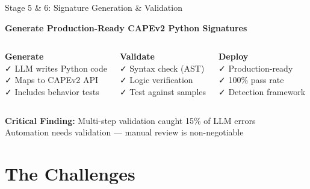 \documentclass[11pt,aspectratio=16:9]{beamer}
\begin{document}
\begin{frame}{Stage 5 \& 6: Signature Generation \& Validation}
  \vspace{0.3cm}
  \begin{tcolorbox}[colback=accent2!10, colframe=accent2, boxrule=2pt]
    {\textbf{Generate Production-Ready CAPEv2 Python Signatures}}
  \end{tcolorbox}
  
  \vspace{0.4cm}
  \small
  \begin{columns}[T]
    \centering
    \textbf{\textcolor{accent1}{Generate}}\\[0.3cm]
    ✓ LLM writes Python code\\
    ✓ Maps to CAPEv2 API\\
    ✓ Includes behavior tests
    
    \centering
    \textbf{\textcolor{accent2}{Validate}}\\[0.3cm]
    ✓ Syntax check (AST)\\
    ✓ Logic verification\\
    ✓ Test against samples
    
    \centering
    \textbf{\textcolor{accent3}{Deploy}}\\[0.3cm]
    ✓ Production-ready\\
    ✓ 100\% pass rate\\
    ✓ Detection framework
  \end{columns}
  
  \vspace{0.8cm}
  \begin{tcolorbox}[colback=accent1!5, colframe=darkblue]
    \textbf{Critical Finding:} Multi-step validation caught 15\% of LLM errors\\
    {\small Automation needs validation — manual review is non-negotiable}
  \end{tcolorbox}
\end{frame}

\section{The Challenges}
\end{document}
